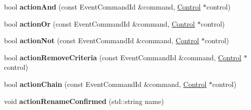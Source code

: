 \begin{DoxyCompactItemize}
\item 
bool {\bfseries action\+And} (const Event\+Command\+Id \&command, \hyperlink{classControl}{Control} $\ast$control)\hypertarget{classNavComputer_a2e62dced2ffe39924e05bd55ba2aacb7}{}\label{classNavComputer_a2e62dced2ffe39924e05bd55ba2aacb7}

\item 
bool {\bfseries action\+Or} (const Event\+Command\+Id \&command, \hyperlink{classControl}{Control} $\ast$control)\hypertarget{classNavComputer_a9c5e7ad19c69d7018cc11ece992229a4}{}\label{classNavComputer_a9c5e7ad19c69d7018cc11ece992229a4}

\item 
bool {\bfseries action\+Not} (const Event\+Command\+Id \&command, \hyperlink{classControl}{Control} $\ast$control)\hypertarget{classNavComputer_a3c7e833dfcb7e00720ba1b7761d890a3}{}\label{classNavComputer_a3c7e833dfcb7e00720ba1b7761d890a3}

\item 
bool {\bfseries action\+Remove\+Criteria} (const Event\+Command\+Id \&command, \hyperlink{classControl}{Control} $\ast$control)\hypertarget{classNavComputer_ae52d7c05ce2dfdc81b700d22ef5d5687}{}\label{classNavComputer_ae52d7c05ce2dfdc81b700d22ef5d5687}

\item 
bool {\bfseries action\+Chain} (const Event\+Command\+Id \&command, \hyperlink{classControl}{Control} $\ast$control)\hypertarget{classNavComputer_a41a487dbdd330be24092bcac5469deab}{}\label{classNavComputer_a41a487dbdd330be24092bcac5469deab}

\item 
void {\bfseries action\+Rename\+Confirmed} (std\+::string name)\hypertarget{classNavComputer_a2b5fa608c8cca56562781d41aa719d91}{}\label{classNavComputer_a2b5fa608c8cca56562781d41aa719d91}

\end{DoxyCompactItemize}
